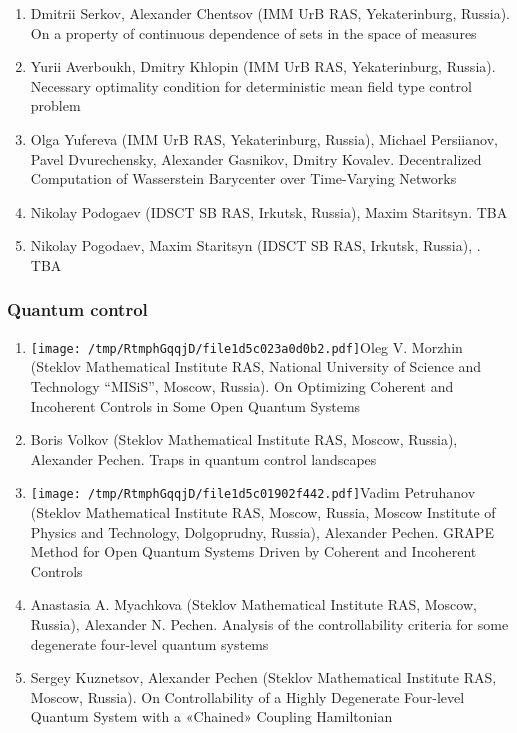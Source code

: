 \documentclass[
]{article}
\providecommand{\tightlist}{%
  \setlength{\itemsep}{0pt}\setlength{\parskip}{0pt}}
\begin{document}
\begin{enumerate}
\def\labelenumi{\arabic{enumi}.}
\tightlist
\item
  Dmitrii Serkov, Alexander Chentsov (IMM UrB RAS, Yekaterinburg,
  Russia). On a property of continuous dependence of sets in the space
  of measures
\item
  Yurii Averboukh, Dmitry Khlopin (IMM UrB RAS, Yekaterinburg, Russia).
  Necessary optimality condition for deterministic mean field type
  control problem
\item
  Olga Yufereva (IMM UrB RAS, Yekaterinburg, Russia), Michael
  Persiianov, Pavel Dvurechensky, Alexander Gasnikov, Dmitry Kovalev.
  Decentralized Computation of Wasserstein Barycenter over Time-Varying
  Networks
\item
  Nikolay Podogaev (IDSCT SB RAS, Irkutsk, Russia), Maxim Staritsyn. TBA
\item
  Nikolay Pogodaev, Maxim Staritsyn (IDSCT SB RAS, Irkutsk, Russia),
  . TBA
\end{enumerate}

\hypertarget{qc}{%
\subsubsection{Quantum control}\label{qc}}

\begin{enumerate}
\def\labelenumi{\arabic{enumi}.}
\tightlist
\item
  \protect\texttt{[image: /tmp/RtmphGqqjD/file1d5c023a0d0b2.pdf]}Oleg
  V. Morzhin (Steklov Mathematical Institute RAS, National University of
  Science and Technology ``MISiS'', Moscow, Russia). On Optimizing
  Coherent and Incoherent Controls in Some Open Quantum Systems
\item
  Boris Volkov (Steklov Mathematical Institute RAS, Moscow, Russia),
  Alexander Pechen. Traps in quantum control landscapes
\item
  \protect\texttt{[image: /tmp/RtmphGqqjD/file1d5c01902f442.pdf]}Vadim
  Petruhanov (Steklov Mathematical Institute RAS, Moscow, Russia, Moscow
  Institute of Physics and Technology, Dolgoprudny, Russia), Alexander
  Pechen. GRAPE Method for Open Quantum Systems Driven by Coherent and
  Incoherent Controls
\item
  Anastasia A. Myachkova (Steklov Mathematical Institute RAS, Moscow,
  Russia), Alexander N. Pechen. Analysis of the controllability criteria
  for some degenerate four-level quantum systems
\item
  Sergey Kuznetsov, Alexander Pechen (Steklov Mathematical Institute
  RAS, Moscow, Russia). On Controllability of a Highly Degenerate
  Four-level Quantum System with a «Chained» Coupling Hamiltonian
\end{enumerate}
\end{document}
